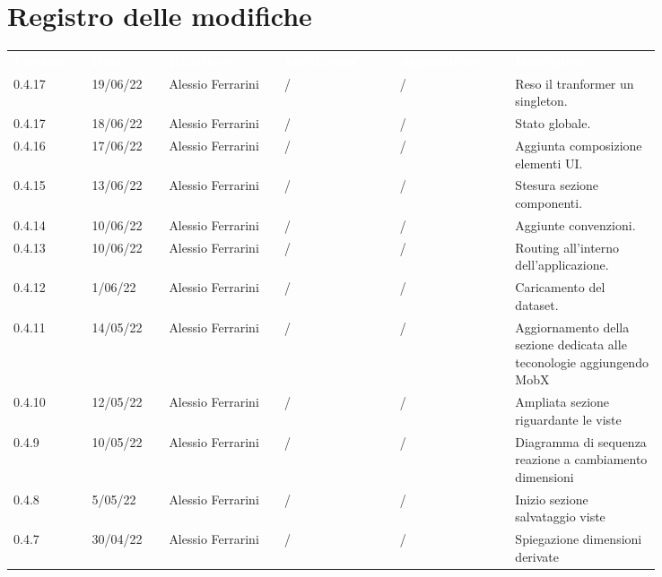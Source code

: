 \section*{Registro delle modifiche}

{\renewcommand{\arraystretch}{1.5}
\scriptsize
\begin{tabular}{p{0.10\linewidth}p{0.10\linewidth}p{0.15\linewidth}p{0.15\linewidth}p{0.15\linewidth}p{0.19\linewidth}}
	\rowcolor[RGB]{33, 73, 50}
	\textcolor{white}{\textbf{Versione}} & \textcolor{white}{\textbf{Data}} &
	\textcolor{white}{\textbf{Redattore}} & \textcolor{white}{\textbf{Verificatore}} &
	\textcolor{white}{\textbf{Approvatore}} & \textcolor{white}{\textbf{Descrizione}}\\
	\rowcolor[RGB]{233, 245, 206}
	0.4.17 & 19/06/22 & Alessio Ferrarini & / & / & Reso il tranformer un singleton.\\
	\rowcolor[RGB]{216, 235, 171}
	0.4.17 & 18/06/22 & Alessio Ferrarini & / & / & Stato globale. \\
	\rowcolor[RGB]{233, 245, 206}
	0.4.16 & 17/06/22 & Alessio Ferrarini & / & / & Aggiunta composizione elementi UI.\\
	\rowcolor[RGB]{216, 235, 171}
	0.4.15 & 13/06/22 & Alessio Ferrarini & / & / & Stesura sezione componenti. \\
	\rowcolor[RGB]{233, 245, 206}
	0.4.14 & 10/06/22 & Alessio Ferrarini & / & / & Aggiunte convenzioni.\\
	\rowcolor[RGB]{216, 235, 171}
	0.4.13 & 10/06/22 & Alessio Ferrarini & / & / & Routing all'interno dell'applicazione. \\
	\rowcolor[RGB]{233, 245, 206}
	0.4.12 & 1/06/22 & Alessio Ferrarini & / & / & Caricamento del dataset.\\
	\rowcolor[RGB]{216, 235, 171}
	0.4.11 & 14/05/22 & Alessio Ferrarini & / & / & Aggiornamento della sezione
  dedicata alle teconologie aggiungendo MobX \\
	\rowcolor[RGB]{233, 245, 206}
	0.4.10 & 12/05/22 & Alessio Ferrarini & / & / & Ampliata sezione riguardante le
  viste \\
	\rowcolor[RGB]{216, 235, 171}
	0.4.9 & 10/05/22 & Alessio Ferrarini & / & / & Diagramma di sequenza reazione
  a cambiamento dimensioni \\
	\rowcolor[RGB]{233, 245, 206}
	0.4.8 & 5/05/22 & Alessio Ferrarini & / & / & Inizio sezione salvataggio
  viste \\
	\rowcolor[RGB]{216, 235, 171}
	0.4.7 & 30/04/22 & Alessio Ferrarini & / & / & Spiegazione dimensioni derivate

\end{tabular}}
